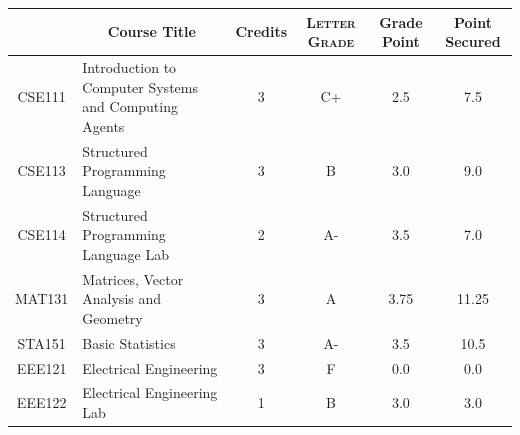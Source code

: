 \documentclass[11pt]{article}
\newcommand*{\numtwo}[1]{\pgfmathprintnumber[
                    fixed, precision=2, fixed zerofill=true]{#1}}
\begin{document}
                \begin{center}
                    \renewcommand{\arraystretch}{1.08}
                    
                \begin{tabular}{|c|l|c|>{\scshape}c|c|c|}
                \hline  \rule[-1ex]{0pt}{3.5ex} {\centering{\bf Course Code}} &  \multicolumn{1}{c|}{\textbf{Course Title}}  & {\bf Credits} & {\bf Letter Grade} & {\bf Grade Point} & {\bf Point Secured}  \\ 
                \hline   CSE111 &  Introduction to Computer Systems and Computing Agents		 & 3 & C+ & 2.5 & 7.5 \\ %
                \hline   CSE113 &  Structured Programming Language		 & 3 & B & 3.0 & 9.0 \\ %
                \hline   CSE114 &  Structured Programming Language Lab		 & 2 & A- & 3.5 & 7.0 \\ %
                \hline   MAT131 &  Matrices, Vector Analysis and Geometry		 & 3 & A & 3.75 & 11.25 \\ %
                \hline   STA151 &  Basic Statistics		 & 3 & A- & 3.5 & 10.5 \\ %
                \hline   EEE121 &  Electrical Engineering		 & 3 & F & 0.0 & 0.0 \\ %
                \hline   EEE122 &  Electrical Engineering Lab		 & 1 & B & 3.0 & 3.0 \\ %

\hline                %
                \end{tabular}
                \end{center}
                \renewcommand{\arraystretch}{1.03}
\end{document}
